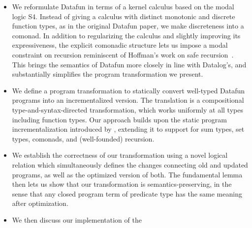 \begin{itemize}
\item We reformulate Datafun in terms of a kernel calculus based on
  the modal logic S4. Instead of giving a calculus with distinct
  monotonic and discrete function types, as in the original Datafun
  paper, we make discreteness into a comonad. In addition to
  regularizing the calculus and slightly improving its expressiveness,
  the explicit comonadic structure lets us impose a modal constraint
  on recursion reminiscent of Hoffman's work on safe
  recursion~\cite{hoffman-safe-recursion}. This brings the semantics
  of Datafun more closely in line with Datalog's, and substantially
  simplifies the program transformation we present.
  
\item We define a program transformation to statically convert
  well-typed Datafun programs into an incrementalized version. The
  translation is a compositional type-and-syntax-directed
  transformation, which works uniformly at all types including
  function types. Our approach builds upon the static program
  incrementalization introduced by \citet{ostermann}, extending it to
  support for sum types, set types, comonads, and (well-founded)
  recursion.

\item We establish the correctness of our transformation using a novel
  logical relation which simultaneously defines the changes connecting
  old and updated programs, as well as the optimized version of both.
  The fundamental lemma then lets us show that our transformation
  is semantics-preserving, in the sense that any closed program term
  of predicate type has the same meaning after optimization. 
  
\item We then discuss our implementation of the  
\end{itemize}







